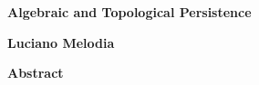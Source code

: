 \begin{center}
    \Large
    \textbf{Algebraic and Topological Persistence}
        
    \vspace{0.4cm}
    \large
    \textbf{Luciano Melodia}
    
    \vspace{0.9cm}
    \textbf{Abstract}
\end{center}

